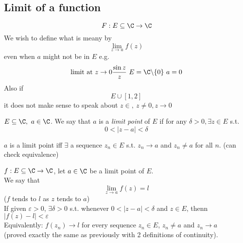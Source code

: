 \subsection{Limit of a function}
\begin{normal}
\[F:E\subseteq \C \to \C\]
We wish to define what is meany by
\[\lim_{z\to a}f(z)\]
even when $a$ might not be in $E$ e.g.
\[\text{limit at }z\to 0 \frac{\sin z}{z} \ E = \C\backslash \{0\} \ a = 0\]
Also if \[E \cup [1,2]\] it does not make sense to speak about $z\in , \ z \neq 0, z \to 0$\\





\end{normal}
\begin{definition}
$E\subseteq \C, \ a \in \C$. We say that $a$ is a \emph{limit point} of $E$ if for any $\delta > 0, \exists z\in E$ s.t.
\[0<|z-a|<\delta\]
\end{definition}
\begin{remark}
$a$ is a limit point iff $\exists$ a sequence $z_n\in E$ s.t. $z_n \to a$ and $z_n \neq a$ for all $n$. (can check  equivalence)
\end{remark}
\begin{definition}
$f:E\subseteq \C\to\C$, let $a\in \C$ be a limit point of $E$.\\
We say that
\[\lim_{z\to a}f(z) = l\]
($f$ tends to $l$ as $z$ tends to $a$)\\
If given $\varepsilon > 0$, $\exists \delta > 0$ s.t. whenever $0<|z-a|<\delta$ and $z\in E$, thenn $|f(z) - l| < \varepsilon$\\
Equivalently: $f(z_n) \to l$ for every sequence $z_n \in E$, $z_n\neq a$ and $z_n \to a$\\
(proved exactly the same as previously with 2 definitions of continuity).
\end{definition}
